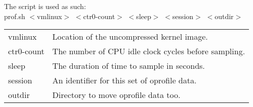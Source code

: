 \documentclass{article}
\begin{document}
\noindent
The script is used as such: \\
\indent prof.sh $<$vmlinux$>$ $<$ctr0-count$>$ $<$sleep$>$ $<$session$>$ $<$outdir$>$

\begin{tabular}[c]{ll}
vmlinux		& Location of the uncompressed kernel image. \\
ctr0-count	& The number of CPU idle clock cycles before sampling. \\
sleep		& The duration of time to sample in seconds. \\
session		& An identifier for this set of oprofile data. \\
outdir		& Directory to move oprofile data too. \\
\end{tabular}
\end{document}
